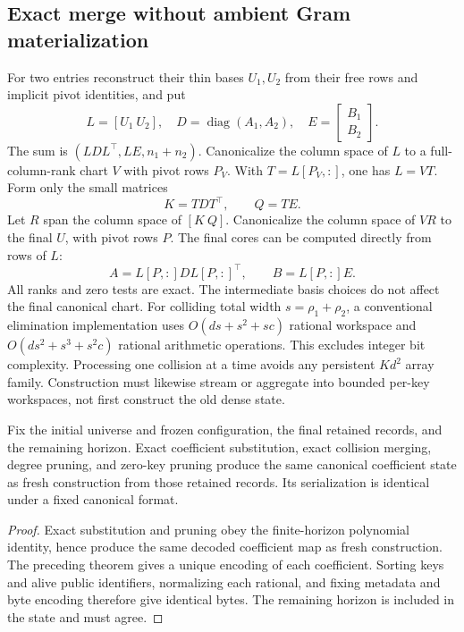 \subsection{Exact merge without ambient Gram materialization}
For two entries reconstruct their thin bases $U_1,U_2$ from their free
rows and implicit pivot identities, and put
\[
 L=[U_1\ U_2],\quad
 D=\operatorname{diag}(A_1,A_2),\quad
 E=\begin{bmatrix}B_1\\B_2\end{bmatrix}.
\]
The sum is $(LDL^\top,LE,n_1+n_2)$. Canonicalize the column space of $L$
to a full-column-rank chart $V$ with pivot rows $P_V$. With
$T=L[P_V,:]$, one has $L=VT$. Form only the small matrices
\[
 K=TDT^\top,\qquad Q=TE.
\]
Let $R$ span the column space of $[K\ Q]$. Canonicalize the column space
of $VR$ to the final $U$, with pivot rows $P$. The final cores can be
computed directly from rows of $L$:
\[
 A=L[P,:]D L[P,:]^\top,\qquad B=L[P,:]E.
\]
All ranks and zero tests are exact. The intermediate basis choices do not
affect the final canonical chart. For colliding total width
$s=\rho_1+\rho_2$, a conventional elimination implementation uses
$O(ds+s^2+sc)$ rational workspace and
$O(ds^2+s^3+s^2c)$ rational arithmetic operations. This excludes integer
bit complexity. Processing one collision at a time avoids any persistent
$K d^2$ array family. Construction must likewise stream or aggregate into
bounded per-key workspaces, not first construct the old dense state.

\begin{theorem}
Fix the initial universe and frozen configuration, the final retained
records, and the remaining horizon. Exact coefficient substitution, exact
collision merging, degree pruning, and zero-key pruning produce the same
canonical coefficient state as fresh construction from those retained
records. Its serialization is identical under a fixed canonical format.
\end{theorem}
\begin{proof}
Exact substitution and pruning obey the finite-horizon polynomial
identity, hence produce the same decoded coefficient map as fresh
construction. The preceding theorem gives a unique encoding of each
coefficient. Sorting keys and alive public identifiers, normalizing each
rational, and fixing metadata and byte encoding therefore give identical
bytes. The remaining horizon is included in the state and must agree.
\end{proof}

